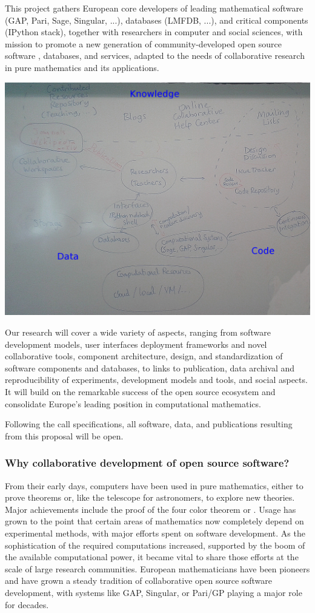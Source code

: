 \documentclass[a4paper,11pt]{article}
\begin{document}
This project gathers European core developers of leading mathematical
software (GAP, Pari, Sage, Singular, ...), databases (LMFDB, ...), and
critical components (IPython stack), together with researchers in
computer and social sciences, with mission to promote a new generation
of community-developed open source software , databases, and services,
adapted to the needs of collaborative research in pure mathematics and
its applications.


\includegraphics[width=.6\textwidth]{Pictures/TheBigPicture.jpg}

Our research will cover a wide variety of aspects, ranging from
software development models, user interfaces   deployment frameworks and novel collaborative tools,
component architecture, design, and standardization of software
components and databases, to links to publication, data archival and
reproducibility of experiments, development models and tools, and
social aspects. It will build on the remarkable success of the open
source ecosystem and consolidate Europe's leading position in
computational mathematics.

Following the call specifications, all software, data, and
publications resulting from this proposal will be open.

\subsubsection{Why collaborative development of open source software?}

From their early days, computers have been used in pure mathematics,
either to prove theorems or, like the telescope for astronomers, to
explore new theories. Major achievements include the proof of the four
color theorem or . Usage has grown to the
point that certain areas of mathematics now completely depend on
experimental methods, with major efforts spent on software
development. As the sophistication of the required computations
increased, supported by the boom of the available computational power,
it became vital to share those efforts at the scale of large research
communities. European mathematicians have been pioneers and have grown
a steady tradition of collaborative open source software development,
with systems like GAP, Singular, or Pari/GP playing a major role for
decades.
\end{document}

